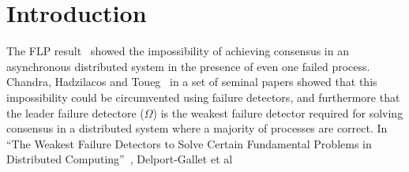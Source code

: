 \section{Introduction}
The FLP result~\cite{fischer1985impossibility} showed the impossibility of achieving consensus in an asynchronous
distributed system in the presence of even one failed process. Chandra, Hadzilacos and
Toueg~\cite{chandra1996unreliable, chandra1996weakest} in a set of seminal papers showed that this impossibility could
be circumvented using failure detectors, and furthermore that the leader failure detectore ($\Omega$) is the
weakest failure detector required for solving consensus in a distributed system where a majority of processes are
correct. In ``The Weakest Failure Detectors to Solve Certain Fundamental Problems in Distributed
Computing''~\cite{delporte2004weakest}, Delport-Gallet et al 
